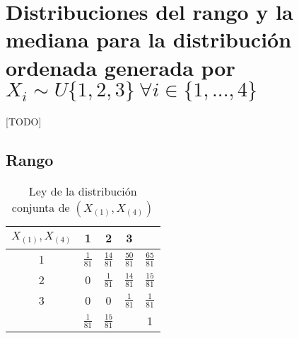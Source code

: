 \documentclass{article}
\begin{document}
  \section{Distribuciones del rango y la mediana para la distribución ordenada generada por $X_i \sim U\{1,2,3\} \ \forall i  \in \{1,...,4\}$}
  \label{sec:e3}

    \paragraph{}
    [TODO]

    \subsection{Rango}


      \begin{table}[H]
        \centering
        \begin{tabular}{c | c  c  c | c}
          $X_{(1)},X_{(4)}$ & 1               & 2               & 3               &                 \\ \hline
          1                 & $\frac{1}{81}$  & $\frac{14}{81}$ & $\frac{50}{81}$ & $\frac{65}{81}$ \\
          2                 & 0               & $\frac{1}{81}$  & $\frac{14}{81}$ & $\frac{15}{81}$ \\
          3                 & 0               & 0               & $\frac{1}{81}$  & $\frac{1}{81}$  \\ \hline
                            &  $\frac{1}{81}$ & $\frac{15}{81}$ &                 & 1
        \end{tabular}
        \caption{Ley de la distribución conjunta de $(X_{(1)},X_{(4)})$}
        \label{}
      \end{table}
\end{document}
